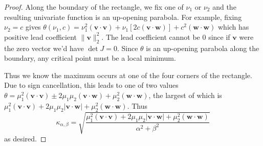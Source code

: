 \documentclass[3p, authoryear, square]{elsarticle}
\theoremstyle{definition}
\begin{document}
\begin{proof}
Along the boundary of the rectangle,
we fix one of \(\nu_1\) or \(\nu_2\) and the resulting univariate function is
an up-opening parabola. For example, fixing \(\nu_2 = c\) gives
\(\theta(\nu_1, c) =
\nu_1^2 \left(\bm{v} \cdot \bm{v}\right) +
\nu_1\left[2 c \left(\bm{v} \cdot \bm{w}\right)\right] +
c^2 \left(\bm{w} \cdot \bm{w}\right)\) which has positive lead coefficient
\(\|\bm{v}\|_2^2\). The lead coefficient cannot be \(0\) since if \(\bm{v}\)
were the zero vector we'd have \(\det J = 0\).
Since \(\theta\) is an up-opening parabola along the boundary, any critical
point must be a local minimum.

Thus we know the maximum occurs at one of the four corners of the
rectangle. Due to sign cancellation, this leads to one of two values
\(\theta =
\mu_1^2 \left(\bm{v} \cdot \bm{v}\right) \pm
2 \mu_1 \mu_2 \left(\bm{v} \cdot \bm{w}\right) +
\mu_2^2 \left(\bm{w} \cdot \bm{w}\right)\), the largest of which is
\(\mu_1^2 \left(\bm{v} \cdot \bm{v}\right) +
2 \mu_1 \mu_2 \left|\bm{v} \cdot \bm{w}\right| +
\mu_2^2 \left(\bm{w} \cdot \bm{w}\right)\). Thus
\begin{equation}\label{eq:intersect-cond-num-too}
\kappa_{\alpha, \beta} = \sqrt{\frac{\mu_1^2
  \left(\bm{v} \cdot \bm{v}\right) +
  2 \mu_1 \mu_2 \left|\bm{v} \cdot \bm{w}\right| +
  \mu_2^2 \left(\bm{w} \cdot \bm{w}\right)}{\alpha^2 + \beta^2}}
\end{equation}
as desired.
\end{proof}
\end{document}
